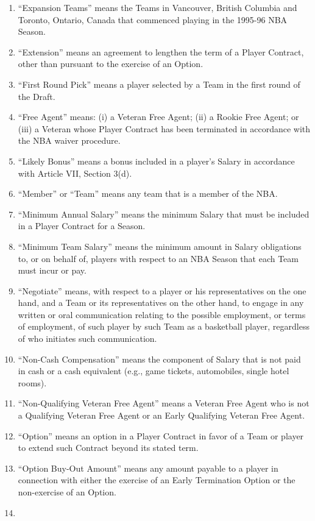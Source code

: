 \documentclass[
]{book}
\begin{document}
\begin{enumerate}
\item
  ``Expansion Teams'' means the Teams in Vancouver, British Columbia and Toronto, Ontario, Canada that commenced playing in the 1995-96 NBA Season.
\item
  ``Extension'' means an agreement to lengthen the term of a Player Contract, other than pursuant to the exercise of an Option.
\item
  ``First Round Pick'' means a player selected by a Team in the first round of the Draft.
\item
  ``Free Agent'' means: (i) a Veteran Free Agent; (ii) a Rookie Free Agent; or (iii) a Veteran whose Player Contract has been terminated in accordance with the NBA waiver procedure.
\item
  ``Likely Bonus'' means a bonus included in a player's Salary in accordance with Article VII, Section 3(d).
\item
  ``Member'' or ``Team'' means any team that is a member of the NBA.
\item
  ``Minimum Annual Salary'' means the minimum Salary that must be included in a Player Contract for a Season.
\item
  ``Minimum Team Salary'' means the minimum amount in Salary obligations to, or on behalf of, players with respect to an NBA Season that each Team must incur or pay.
\item
  ``Negotiate'' means, with respect to a player or his representatives on the one hand, and a Team or its representatives on the other hand, to engage in any written or oral communication relating to the possible employment, or terms of employment, of such player by such Team as a basketball player, regardless of who initiates such communication.
\item
  ``Non-Cash Compensation'' means the component of Salary that is not paid in cash or a cash equivalent (e.g., game tickets, automobiles, single hotel rooms).
\item
  ``Non-Qualifying Veteran Free Agent'' means a Veteran Free Agent who is not a Qualifying Veteran Free Agent or an Early Qualifying Veteran Free Agent.
\item
  ``Option'' means an option in a Player Contract in favor of a Team or player to extend such Contract beyond its stated term.
\item
  ``Option Buy-Out Amount'' means any amount payable to a player in connection with either the exercise of an Early Termination Option or the non-exercise of an Option.
\item

\end{enumerate}
\end{document}
